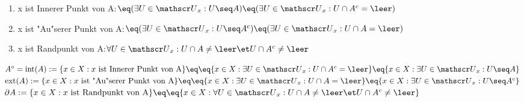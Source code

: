 \begin{definition}\label{2.27}   
\begin{enumerate}
\item x ist Innerer Punkt von A:$\eq (\exists U\in\umg{U}{x}: U\seq A)\eq (\exists U\in \umg{U}{x}:U\cap A^c=\leer )$\vspace*{-0.9cm}\\
\item x ist "Au"serer Punkt von A:$\eq (\exists U\in\umg{U}{x}: U\seq A^c)\eq (\exists U\in\umg{U}{x}:U\cap A=\leer )$\vspace*{-0.9cm}\\
\item x ist Randpunkt von A:$\forall U\in\umg{U}{x}: U\cap A\neq\leer \et U\cap A^c\neq\leer$\vspace*{-0.9cm}\\
\end{enumerate}
$\inn{A} = \mbox{int}(A) :=\{ x\in X: x \mbox{ ist Innerer Punkt von A}\}\eq\\
\eq\{x\in X:\exists U\in\umg{U}{x}: U\cap A^c=\leer\}\eq\{ x\in X:\exists U\in\umg{U}{x}:U\seq A\}\vspace*{0.2cm}$\\
$\ext{A} :=\{ x\in X: x \mbox{ ist "Au"serer Punkt von A}\}\eq\\
\eq\{x\in X:\exists U\in\umg{U}{x}: U\cap A=\leer\}\eq\{ x\in X:\exists U\in\umg{U}{x}:U\seq A^c\}\vspace*{0.2cm}$\\
$\bd{A} :=\{ x\in X: x \mbox{ ist Randpunkt von A}\}\eq\\
\eq\{x\in X:\forall U\in\umg{U}{x}: U\cap A\neq\leer \et U\cap A^c\neq\leer\}$
\end{definition}

